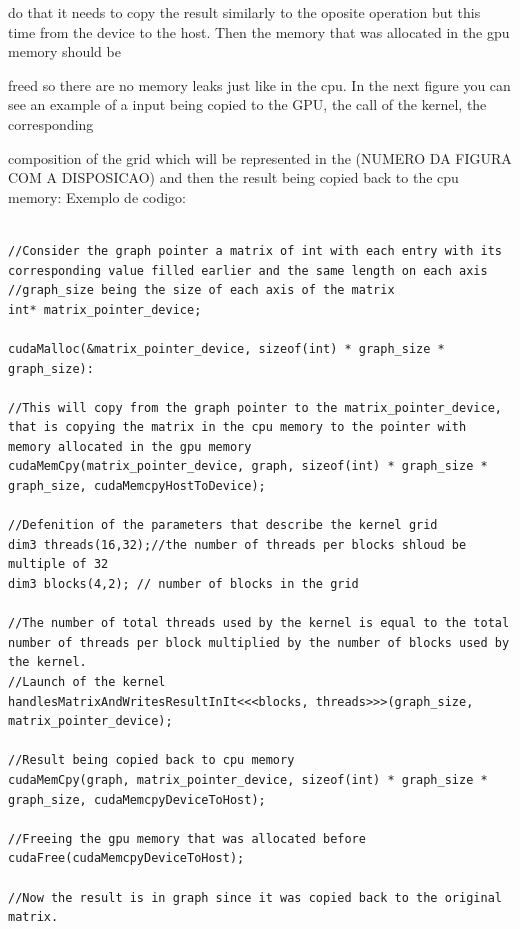 \documentclass[runningheads]{llncs}
\begin{document}
do that it needs to copy the result similarly to the oposite operation but this time from the device to the host. Then the memory that was allocated in the gpu memory should be 

freed so there are no memory leaks just like in the cpu. In the next figure you can see an example of a input being copied to the GPU, the call of the kernel, the corresponding 

composition of the grid which will be represented in the (NUMERO DA FIGURA COM A DISPOSICAO) and then the result being copied back to the cpu memory:
\newline
Exemplo de codigo: 
\newline

\begin{lstlisting}[language=Cuda, caption=Cuda example]

//Consider the graph pointer a matrix of int with each entry with its corresponding value filled earlier and the same length on each axis
//graph_size being the size of each axis of the matrix
int* matrix_pointer_device;

cudaMalloc(&matrix_pointer_device, sizeof(int) * graph_size * graph_size):

//This will copy from the graph pointer to the matrix_pointer_device, that is copying the matrix in the cpu memory to the pointer with memory allocated in the gpu memory
cudaMemCpy(matrix_pointer_device, graph, sizeof(int) * graph_size * graph_size, cudaMemcpyHostToDevice);

//Defenition of the parameters that describe the kernel grid
dim3 threads(16,32);//the number of threads per blocks shloud be multiple of 32
dim3 blocks(4,2); // number of blocks in the grid

//The number of total threads used by the kernel is equal to the total number of threads per block multiplied by the number of blocks used by the kernel.
//Launch of the kernel
handlesMatrixAndWritesResultInIt<<<blocks, threads>>>(graph_size, matrix_pointer_device);

//Result being copied back to cpu memory
cudaMemCpy(graph, matrix_pointer_device, sizeof(int) * graph_size * graph_size, cudaMemcpyDeviceToHost);

//Freeing the gpu memory that was allocated before
cudaFree(cudaMemcpyDeviceToHost);

//Now the result is in graph since it was copied back to the original matrix.

\end{lstlisting}
\end{document}
